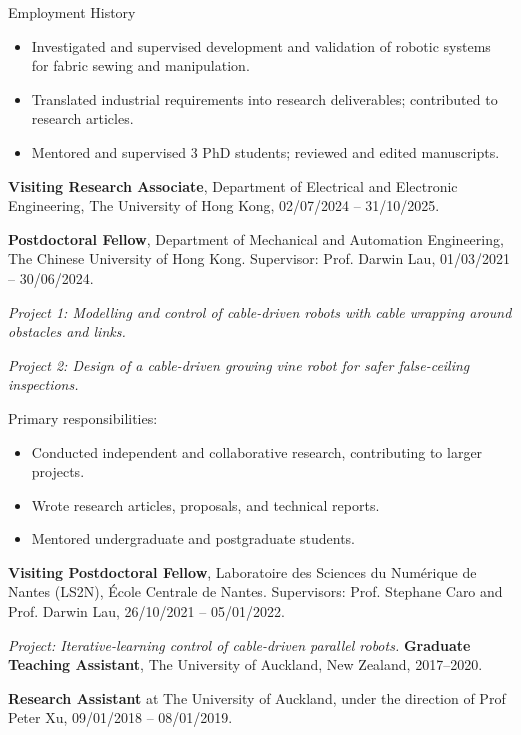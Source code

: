 \begin{rubric}{Employment History}
\begin{itemize}
        \item Investigated and supervised development and validation of robotic systems for fabric sewing and manipulation.
        \item Translated industrial requirements into research deliverables; contributed to research articles.
        \item Mentored and supervised 3 PhD students; reviewed and edited manuscripts.
    \end{itemize}


\entry*[2024 -- 2025]%
	\textbf{Visiting Research Associate}, Department of Electrical and Electronic Engineering, The University of Hong Kong, 02/07/2024 -- 31/10/2025.

\entry*[2021 -- 2024]%
	\textbf{Postdoctoral Fellow}, Department of Mechanical and Automation Engineering, The Chinese University of Hong Kong. Supervisor: Prof. Darwin Lau, 01/03/2021 -- 30/06/2024.
 \par \textit{Project 1: Modelling and control of cable-driven robots with cable wrapping around obstacles and links.}
 \par \textit{Project 2: Design of a cable-driven growing vine robot for safer false-ceiling inspections.}

 Primary responsibilities:
 \begin{itemize}
    \item Conducted independent and collaborative research, contributing to larger projects.  
    \item Wrote research articles, proposals, and technical reports.  
    \item Mentored undergraduate and postgraduate students.
 \end{itemize}
 
\entry*[2021 -- 2022]%
    \textbf{Visiting Postdoctoral Fellow}, Laboratoire des Sciences du Numérique de Nantes (LS2N), École Centrale de Nantes. Supervisors: Prof. Stephane Caro and Prof. Darwin Lau, 26/10/2021 -- 05/01/2022.
    \par \textit{Project: Iterative-learning control of cable-driven parallel robots.}
\entry*[2017 -- 2020]%
	\textbf{Graduate Teaching Assistant}, The University of Auckland, New Zealand, 2017--2020.

\entry*[2018 -- 2019]%
	\textbf{Research Assistant} at The University of Auckland, under the direction of Prof Peter Xu, 09/01/2018 -- 08/01/2019.
    

\end{rubric}
